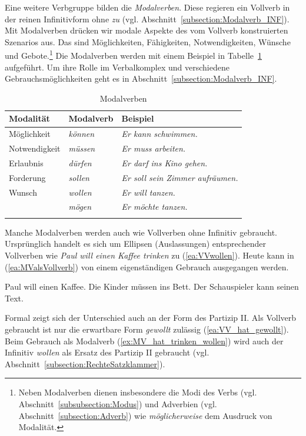 Eine weitere Verbgruppe bilden die \textit{Modalverben}. Diese regieren ein Vollverb in der reinen Infinitivform ohne \textit{zu} (vgl. Abschnitt~\ref{subsection:Modalverb_INF}). Mit Modalverben drücken wir modale Aspekte des vom Vollverb konstruierten Szenarios aus. Das sind \zB Möglichkeiten, Fähigkeiten, Notwendigkeiten, Wünsche und Gebote.\footnote{Neben Modalverben dienen insbesondere die Modi des Verbs (vgl. Abschnitt~\ref{subsubsection:Modus}) und Adverbien (vgl. Abschnitt~\ref{subsection:Adverb}) wie \textit{möglicherweise} dem Ausdruck von Modalität.} Die Modalverben werden mit einem Beispiel in Tabelle~\ref{tab:Modalverben} aufgeführt. Um ihre Rolle im Verbalkomplex und verschiedene Gebrauchsmöglichkeiten geht es in Abschnitt~\ref{subsection:Modalverb_INF}.

\begin{table}
  \centering
  \begin{tabularx}{\textwidth}{XXl}
    \lsptoprule
    Modalität & Modalverb & Beispiel \\
    \hline
    Möglichkeit & \textit{können} & \textit{Er kann schwimmen.}\\
    Notwendigkeit & \textit{müssen} & \textit{Er muss arbeiten.}\\
    Erlaubnis & \textit{dürfen} & \textit{Er darf ins Kino gehen.} \\ 
    Forderung & \textit{sollen} & \textit{Er soll sein Zimmer aufräumen.}\\  
    Wunsch & \textit{wollen} & \textit{Er will tanzen.}\\
    & \textit{mögen} & \textit{Er möchte tanzen.}\\
    \lspbottomrule 
  \end{tabularx}
  \caption{Modalverben}
  \label{tab:Modalverben}
\end{table}


Manche Modalverben werden auch wie Vollverben ohne Infinitiv gebraucht. Ursprünglich handelt es sich um Ellipsen (Auslassungen) entsprechender Vollverben wie \textit{Paul will einen Kaffee trinken} zu (\ref{ea:VVwollen}). Heute kann in (\ref{ea:MValsVollverb}) von einem eigenständigen Gebrauch ausgegangen werden. 

\newpage
\ea \label{ea:MValsVollverb}
\ea \label{ea:VVwollen} Paul will einen Kaffee.
\ex \label{ex:VVmüssen} Die Kinder müssen ins Bett.
\ex \label{ex:VVkönnen} Der Schauspieler kann seinen Text.
\z
\z 

Formal zeigt sich der Unterschied auch an der Form des Partizip II. Als Vollverb gebraucht ist nur die erwartbare Form \textit{gewollt} zulässig (\ref{ea:VV_hat_gewollt}). Beim Gebrauch als Modalverb (\ref{ex:MV_hat_trinken_wollen}) wird auch der Infinitiv \textit{wollen} als Ersatz des Partizip II gebraucht (vgl. Abschnitt~\ref{subsection:RechteSatzklammer}).

